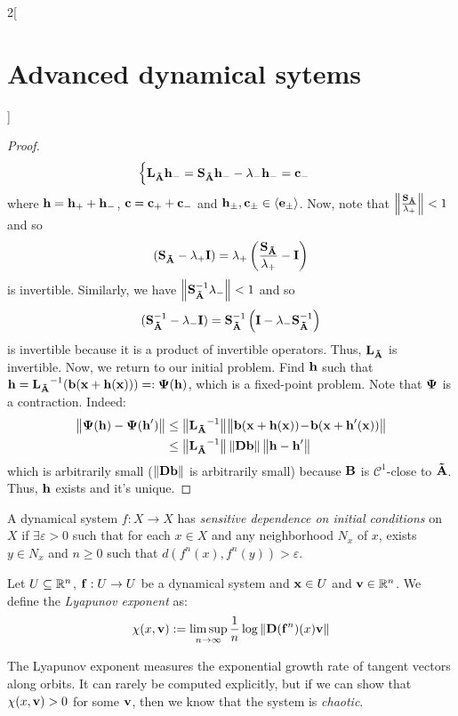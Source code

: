 \documentclass[../../../main_math.tex]{subfiles}
\begin{document}
\begin{multicols}{2}[\section{Advanced dynamical sytems}]
\begin{proof}
$$\begin{cases}
        \vf{L}_{\vf{\tilde{A}}}\vf{h}_-=\vf{S}_{\vf{\tilde{A}}}\vf{h}_--\lambda_-\vf{h}_-=\vf{c}_-
      \end{cases}
    $$
    where $\vf{h}=\vf{h}_++\vf{h}_-$, $\vf{c}=\vf{c}_++\vf{c}_-$ and $\vf{h}_\pm,\vf{c}_\pm\in \langle \vf{e}_\pm\rangle$. Now, note that $\norm{\frac{\vf{S}_{\vf{\tilde{A}}}}{\lambda_+}}<1$ and so
    $$
      (\vf{S}_{\vf{\tilde{A}}}-\lambda_+\vf{I})=\lambda_+\left(\frac{\vf{S}_{\vf{\tilde{A}}}}{\lambda_+}-\vf{I}\right)
    $$
    is invertible. Similarly, we have $\norm{\vf{S}_{\vf{\tilde{A}}}^{-1}\lambda_-}<1$ and so
    $$
      (\vf{S}_{\vf{\tilde{A}}}^{-1}-\lambda_-\vf{I})=\vf{S}_{\vf{\tilde{A}}}^{-1}\left(\vf{I}-\lambda_-\vf{S}_{\vf{\tilde{A}}}^{-1}\right)
    $$
    is invertible because it is a product of invertible operators. Thus, $\vf{L}_{\vf{\tilde{A}}}$ is invertible. Now, we return to our initial problem. Find $\vf{h}$ such that $\vf{h}= {\vf{L}_{\vf{\tilde{A}}}}^{-1}(\vf{b}(\vf{x}+\vf{h}(\vf{x})))=:\vf\Psi(\vf{h})$, which is a fixed-point problem. Note that $\vf\Psi$ is a contraction. Indeed:
    \begin{align*}
      \norm{\vf\Psi(\vf{h})-\vf\Psi(\vf{h}')} & \leq \norm{{\vf{L}_{\vf{\tilde{A}}}}^{-1}}\!\norm{\vf{b}(\vf{x}+\vf{h}(\vf{x}))\!-\!\vf{b}(\vf{x}+\vf{h}'(\vf{x}))} \\
                                              & \leq \norm{{\vf{L}_{\vf{\tilde{A}}}}^{-1}}\norm{\vf{Db}}\norm{\vf{h}-\vf{h}'}
    \end{align*}
    which is arbitrarily small ($\norm{\vf{Db}}$ is arbitrarily small) because $\vf{B}$ is $\mathcal{C}^1$-close to $\vf{\tilde{A}}$. Thus, $\vf{h}$ exists and it's unique.
  \end{proof}
  \begin{definition}
    A dynamical system $f : X\rightarrow X$ has \emph{sensitive dependence on initial conditions} on $X$ if $\exists\varepsilon >0$ such that for each $x\in X$ and any neighborhood $N_x$ of $x$, exists $y \in N_x$ and $n \geq  0$ such that $d(f^n(x),f^n(y)) > \varepsilon$.
  \end{definition}
  \begin{definition}
    Let $U\subseteq \RR^n$, $\vf{f}:U\to U$ be a dynamical system and $\vf{x}\in U$ and $\vf{v}\in\RR^n$. We define the \emph{Lyapunov exponent} as:
    $$
      \chi(x,\vf{v}):=\limsup_{n\to\infty}\frac{1}{n}\log\norm{\vf{D}(\vf{f}^n)(x)\vf{v}}
    $$
  \end{definition}
  \begin{remark}
    The Lyapunov exponent measures the exponential growth rate of tangent vectors along orbits. It can rarely be computed explicitly, but if we can show that $\chi(x,\vf{v})>0$ for some $\vf{v}$, then we know that the system is \emph{chaotic}.
  \end{remark}

\end{multicols}
\end{document}

